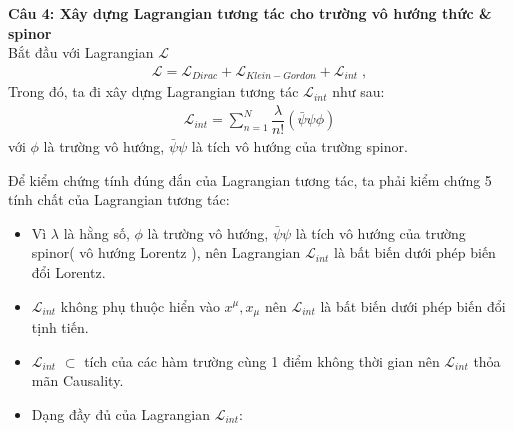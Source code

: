 \documentclass{article}
\newcommand{\f}[2]{\dfrac{#1}{#2}}
\begin{document}
\textbf{Câu 4: Xây dựng Lagrangian tương tác cho trường vô hướng thức \& spinor}\\
Bắt đầu với Lagrangian $\mathcal{L}$
\begin{align}
	\mathcal{L} = \mathcal{L}_{Dirac} + \mathcal{L}_{Klein - Gordon} + \mathcal{L}_{int} \;,
\end{align}
Trong đó, ta đi xây dựng Lagrangian tương tác $\mathcal{L}_{int}$ như sau:
\begin{align}
	\mathcal{L}_{int} = \sum_{n=1}^{N} \f{\lambda}{n!}(\bar{\psi}\psi\phi)
\end{align}
với $\phi$ là trường vô hướng,  $\bar{\psi}\psi$ là tích vô hướng của trường spinor.

Để kiểm chứng tính đúng đắn của Lagrangian tương tác, ta phải kiểm chứng 5 tính chất của Lagrangian tương tác:
\begin{itemize}
	\item Vì $\lambda$ là hằng số, $\phi$ là trường vô hướng,  $\bar{\psi}\psi$ là tích vô hướng của trường spinor( vô hướng Lorentz ), nên Lagrangian $\mathcal{L}_{int}$ là bất biến dưới phép biến đổi Lorentz.
	\item $\mathcal{L}_{int}$ không phụ thuộc hiển vào $x^{\mu},x_{\mu}$ nên $\mathcal{L}_{int}$ là bất biến dưới phép biến đổi tịnh tiến.
	\item $\mathcal{L}_{int}$ $\subset$ tích của các hàm trường cùng 1 điểm không thời gian nên $\mathcal{L}_{int}$ thỏa mãn Causality.
	\item Dạng đầy đủ của Lagrangian $\mathcal{L}_{int}$:
\end{itemize}
\end{document}
